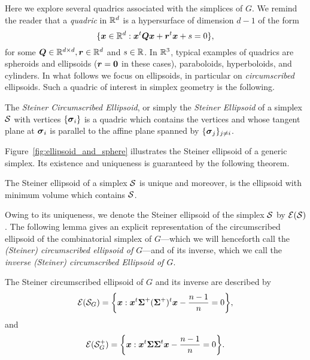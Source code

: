 Here we explore several quadrics associated with the simplices of $G$. 
We remind the reader that a  \emph{quadric} in $\mathbb{R}^d$ is a hypersurface of dimension $d-1$ of the form 
\begin{equation*}
\{\vb*{x}\in\mathbb{R}^d: \vb*{x}^t \vb*{Q}\vb*{x} + \vb*{r}^t \vb*{x} + s=0\},
\end{equation*}
for some $\vb*{Q}\in\mathbb{R}^{d\times d},\vb*{r}\in\mathbb{R}^d$  and $s\in \mathbb{R}$. 
In $\mathbb{R}^3$, typical examples of quadrics are spheroids and ellipsoids ($\vb*{r}=\vb{0}$ in these cases), paraboloids, hyperboloids, and  cylinders. In what follows we focus on ellipsoids, in particular on \emph{circumscribed} ellipsoids. Such a quadric of interest in simplex geometry is the following. 

\begin{definition}
\label{def:steiner_ellipsoid}
The \emph{Steiner Circumscribed Ellipsoid}, or simply the \emph{Steiner Ellipsoid} of a simplex $\mathcal{S}$ with vertices $\{\vb*{\sigma}_i\}$ is a quadric which contains the vertices and whose tangent plane at $\vb*{\sigma}_i$ is parallel to the affine plane spanned by $\{\vb*{\sigma}_j\}_{j\neq i}$. 
\end{definition}

Figure~\ref{fig:ellipsoid_and_sphere} illustrates  the Steiner ellipsoid of a generic simplex. Its existence  and uniqueness is guaranteed by the following theorem. 

\begin{theorem}
The Steiner ellipsoid of a simplex $\mathcal{S}$ is unique and moreover, is the ellipsoid with minimum volume which contains $\mathcal{S}$. 
\end{theorem}

Owing to its uniqueness, we denote the Steiner ellipsoid of the simplex $\mathcal{S}$ by $\mathcal{E}(\mathcal{S})$. The following lemma gives an explicit representation of the circumscribed ellipsoid of the combinatorial simplex of $G$---which we will  henceforth call the \emph{(Steiner) circumscribed ellipsoid of $G$}---and of its inverse, which we call the \emph{inverse (Steiner) circumscribed Ellipsoid of $G$}. 

\begin{lemma}
	\label{lem:El(S)}
The Steiner circumscribed ellipsoid  of $G$ and its inverse  are described by 
\begin{equation}
\label{eq:steinerE}
    \mathcal{E}(\mathcal{S}_G) = \bigg\{\vb*{x}: \vb*{x}^t \boldsymbol{\Sigma}^+(\boldsymbol{\Sigma}^+)^t \vb*{x} - \frac{n-1}{n}=0\bigg\},
\end{equation}
and 
\begin{equation}
\label{eq:steinerE_inverse}
\mathcal{E}(\mathcal{S}^+_G) = \bigg\{\vb*{x}: \vb*{x}^t \boldsymbol{\Sigma}\boldsymbol{\Sigma}^t \vb*{x} - \frac{n-1}{n}=0\bigg\}.
\end{equation}
\end{lemma}


